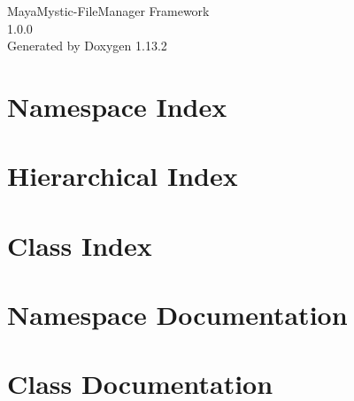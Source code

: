 \documentclass[twoside]{book}
\newcommand{\+}{\discretionary{\mbox{\scriptsize$\hookleftarrow$}}{}{}}
\newcommand{\clearemptydoublepage}{%
    \newpage{\pagestyle{empty}\cleardoublepage}%
  }
\begin{document}
  \raggedbottom
    \hypersetup{pageanchor=false,
                bookmarksnumbered=true,
                pdfencoding=unicode
               }
  \begin{titlepage}
  \vspace*{7cm}
  \begin{center}%
  {\Large Maya\+Mystic-\/\+File\+Manager Framework}\\
  [1ex]\large 1.\+0.\+0 \\
  \vspace*{1cm}
  {\large Generated by Doxygen 1.13.2}\\
  \end{center}
  \end{titlepage}
  \clearemptydoublepage
  \tableofcontents
  \clearemptydoublepage
  \hypersetup{pageanchor=true}
\chapter{Namespace Index}

\chapter{Hierarchical Index}

\chapter{Class Index}

\chapter{Namespace Documentation}









\chapter{Class Documentation}





  \backmatter
  \newpage
  \clearemptydoublepage
  \printindex
\end{document}
